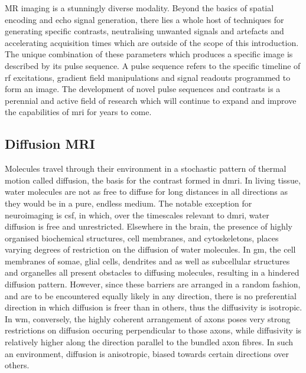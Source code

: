 MR imaging is a stunningly diverse modality.
Beyond the basics of spatial encoding and echo signal generation, there lies a whole host of techniques for generating specific contrasts, neutralising unwanted signals and artefacts and accelerating acquisition times which are outside of the scope of this introduction.
The unique combination of these  parameters which produces a specific image is described by its pulse sequence.
A pulse sequence refers to the specific timeline of \gls{rf} excitations, gradient field manipulations and signal readouts programmed to form an image.
The development of novel pulse sequences and contrasts is a perennial and active field of research which will continue to expand and improve the capabilities of \gls{mri} for years to come.

\subsection{Diffusion MRI}


Molecules travel through their environment in a stochastic pattern of thermal motion called diffusion, the basis for the contrast formed in \gls{dmri}. 
In living tissue, water molecules are not as free to diffuse for long distances in all directions as they would be in a pure, endless medium.
The notable exception for neuroimaging is \gls{csf}, in which, over the timescales relevant to \gls{dmri}, water diffusion is free and unrestricted. 
Elsewhere in the brain, the presence of highly organised biochemical structures, cell membranes, and cytoskeletons, places varying degrees of restriction  on the diffusion of water molecules.
In \gls{gm}, the cell membranes of somae, glial cells, dendrites and  as well as subcellular structures and organelles all present obstacles to diffusing molecules, resulting in a hindered diffusion pattern.
However, since these barriers are arranged in a random fashion, and are to be encountered equally likely in any direction, there is no preferential direction in which diffusion is freer than in others, thus the diffusivity is isotropic.
In \gls{wm}, conversely, the highly coherent arrangement of axons poses very strong restrictions on diffusion occuring perpendicular to those axons, while diffusivity is relatively higher along the direction parallel to the bundled axon fibres.
In such an environment, diffusion is anisotropic, biased towards certain directions over others.

